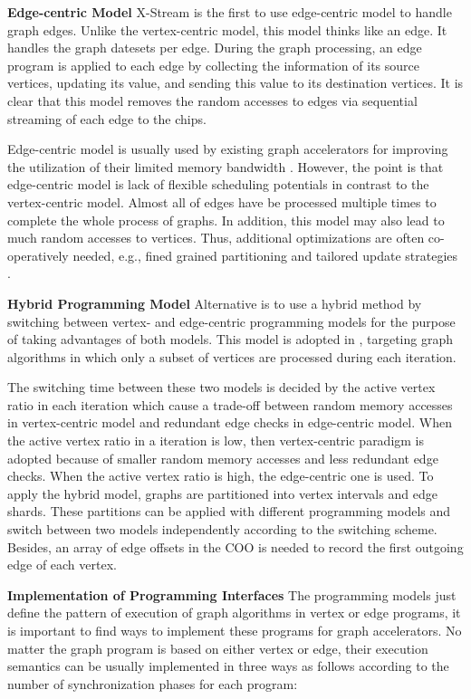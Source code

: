 \documentclass[twoside]{article}
\begin{document}
\begin{multicols}{2}
{\bf Edge-centric Model}\quad
X-Stream \cite{Roy2013x-stream} is the first to use edge-centric model to handle graph edges. Unlike the vertex-centric model, this model thinks like an edge. It handles the graph datesets per edge. During the graph processing, an edge program is applied to each edge by collecting the information of its source vertices, updating its value, and sending this value to its destination vertices. It is clear that this model removes the random accesses to edges via sequential streaming of each edge to the chips. 

Edge-centric model is usually used by existing graph accelerators for improving the utilization of their limited memory bandwidth \cite{zhou2016highthroughput,Dai2017foregraph, Zhou2018fastcf}. However, the point is that edge-centric model is lack of flexible scheduling potentials in contrast to the vertex-centric model. Almost all of edges have be processed multiple times to complete the whole process of graphs. In addition, this model may also lead to much random accesses to vertices. Thus, additional optimizations are often co-operatively needed, e.g., fined grained partitioning and tailored update strategies \cite{Dai2017foregraph,song2018graphr}.

{\bf Hybrid Programming Model}\quad
Alternative is to use a hybrid method by switching between vertex- and edge-centric programming models for the purpose of taking advantages of both models. This model is adopted in \cite{zhou2017cpufpga}, targeting graph algorithms in which only a subset of vertices are processed during each iteration.

The switching time between these two models is decided by the active vertex ratio in each iteration which cause a trade-off between random memory accesses in vertex-centric model and redundant edge checks in edge-centric model. When the active vertex ratio in a iteration is low, then vertex-centric paradigm is adopted because of smaller random memory accesses and less redundant edge checks. When the active vertex ratio is high, the edge-centric one is used. To apply the hybrid model, graphs are partitioned into vertex intervals and edge shards. These partitions can be applied with different programming models and switch between two models independently according to the switching scheme. Besides, an array of edge offsets in the COO is needed to record the first outgoing edge of each vertex.



{\bf Implementation of Programming Interfaces}
The programming models just define the pattern of execution of graph algorithms in vertex or edge programs, it is important to find ways to implement these programs for graph accelerators. No matter the graph program is based on either vertex or edge, their execution semantics can be usually implemented in three ways as follows according to the number of synchronization phases for each program:


\end{multicols}
\end{document}
